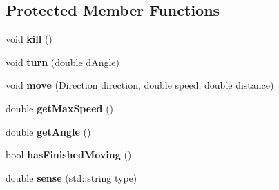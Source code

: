 \subsection*{Protected Member Functions}
\begin{DoxyCompactItemize}
\item 
void {\bfseries kill} ()\hypertarget{class_drone_a87b644ed6c297252a0930b4a915a553e}{}\label{class_drone_a87b644ed6c297252a0930b4a915a553e}

\item 
void {\bfseries turn} (double d\+Angle)\hypertarget{class_drone_a81c5a726112abba3d686e95baccd54be}{}\label{class_drone_a81c5a726112abba3d686e95baccd54be}

\item 
void {\bfseries move} (Direction direction, double speed, double distance)\hypertarget{class_drone_ae7ebc3df04a42e9c49389ab2868d102d}{}\label{class_drone_ae7ebc3df04a42e9c49389ab2868d102d}

\item 
double {\bfseries get\+Max\+Speed} ()\hypertarget{class_drone_a780e43c6486a26eb47a37295ea510269}{}\label{class_drone_a780e43c6486a26eb47a37295ea510269}

\item 
double {\bfseries get\+Angle} ()\hypertarget{class_drone_a6a5dccb74616583e76ff52252a9727a7}{}\label{class_drone_a6a5dccb74616583e76ff52252a9727a7}

\item 
bool {\bfseries has\+Finished\+Moving} ()\hypertarget{class_drone_a71ef7484d1ec8c314beec47d5e3046d1}{}\label{class_drone_a71ef7484d1ec8c314beec47d5e3046d1}

\item 
double {\bfseries sense} (std\+::string type)\hypertarget{class_drone_abd485e52d2ac2d6d81038665495bb480}{}\label{class_drone_abd485e52d2ac2d6d81038665495bb480}

\end{DoxyCompactItemize}
